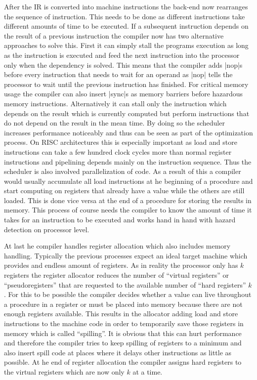{After the IR is converted into machine instructions the back-end now rearranges the sequence of instruction.
This needs to be done as different instructions take different amounts of time to be executed.
If a subsequent instruction depends on the result of a previous instruction the compiler now has two alternative approaches to solve this.
First it can simply stall the programs execution as long as the instruction is executed and feed the next instruction into the processor only when the dependency is solved.
This means that the compiler adds |nop|s before every instruction that needs to wait for an operand as |nop| tells the processor to wait until the previous instruction has finished.
For critical memory usage the compiler can also insert |sync|s as memory barriers before hazardous memory instructions.
Alternatively it can stall only the instruction which depends on the result which is currently computed but perform instructions that do not depend on the result in the mean time.
By doing so the scheduler increases performance noticeably and thus can be seen as part of the optimization process.
On \ac{RISC} architectures this is especially important as load and store instructions can take a few hundred clock cycles more than normal register instructions and pipelining depends mainly on the instruction sequence.
Thus the scheduler is also involved parallelization of code.
As a result of this a compiler would usually accumulate all load instructions at he beginning of a procedure and start computing on registers that already have a value while the others are still loaded.
This is done vice versa at the end of a procedure for storing the results in memory.
This process of course needs the compiler to know the amount of time it takes for an instruction to be executed and works hand in hand with hazard detection on processor level.

At last he compiler handles register allocation which also includes memory handling.
Typically the previous processes expect an ideal target machine which provides and endless amount of registers.
As in reality the processor only has $k$ registers the register allocator reduces the number of ``virtual registers'' or ``pseudoregisters'' that are requested to the available number of ``hard registers'' $k$.
For this to be possible the compiler decides whether a value can live throughout a procedure in a register or must be placed into memory because there are not enough registers available.
This results in the allocator adding load and store instructions to the machine code in order to temporarily save those registers in memory which is called ``spilling''.
It is obvious that this can hurt performance and therefore the compiler tries to keep spilling of registers to a minimum and also insert spill code at places where it delays other instructions as little as possible.
At he end of register allocation the compiler assigns hard registers to the virtual registers which are now only $k$ at a time.

}
